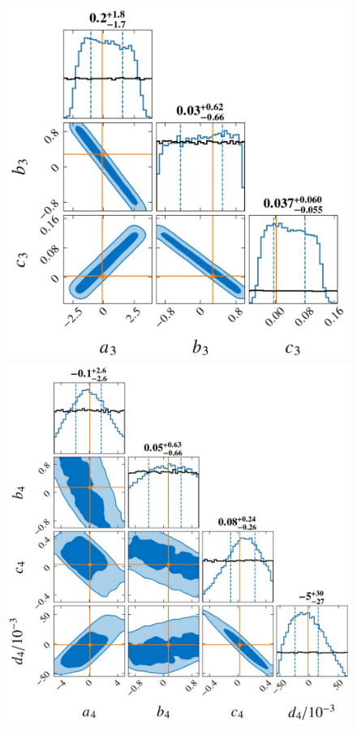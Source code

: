 \documentclass[a4paper,11pt]{article}
\begin{document}
\begin{figure}
    \begin{minipage}[t]{0.49\textwidth}
    \centering
    \includegraphics[width=0.8\linewidth]{Hyper_parameter_3d.pdf}%
    \end{minipage}
    \hfill
    \begin{minipage}[t]{0.49\textwidth}
    \centering
    \includegraphics[width=0.8\linewidth]{Hyper_parameter_4d.pdf}
    \end{minipage}
    \vspace{3mm}

\end{figure}
\end{document}
